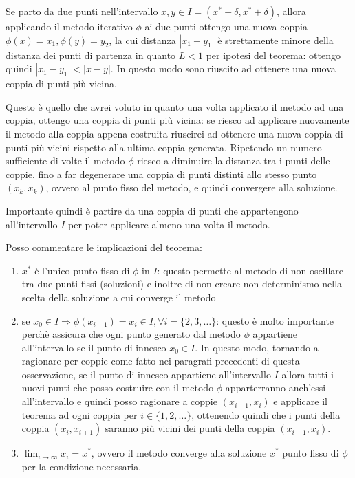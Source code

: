 \begin{oss}
Se parto da due punti nell'intervallo $x, y \in I = (x^{*} - \delta, x^{*} +
\delta)$, allora applicando il metodo iterativo $\phi$ ai due punti ottengo una
nuova coppia $\phi(x) = x_{1}, \phi(y) = y_{2}$, la cui distanza $|x_{1} - y_{1}|$
\`e strettamente minore della distanza dei punti di partenza in quanto $L < 1$
per ipotesi del teorema: ottengo quindi $|x_{1} - y_{1}| < |x - y|$. In questo
modo sono riuscito ad ottenere una nuova coppia di punti pi\`u vicina.

Questo \`e quello che avrei voluto in quanto una volta applicato il metodo ad
una coppia, ottengo una coppia di punti pi\`u vicina: se riesco ad applicare
nuovamente il metodo alla coppia appena costruita riuscirei ad ottenere una
nuova coppia di punti pi\`u vicini rispetto alla ultima coppia generata.
Ripetendo un numero sufficiente di volte il metodo $\phi$ riesco a diminuire la
distanza tra i punti delle coppie, fino a far degenerare una coppia di punti
distinti allo stesso punto $(x_{k}, x_{k})$, ovvero al punto fisso del metodo,
e quindi convergere alla soluzione.

Importante quindi \`e partire da una coppia di punti che appartengono
all'intervallo $I$ per poter applicare almeno una volta il metodo.

Posso commentare le implicazioni del teorema:
\begin{enumerate}
  \item $x^{*}$ \`e l'unico punto fisso di $\phi$ in $I$: questo permette al
  metodo di non oscillare tra due punti fissi (soluzioni) e inoltre di non
  creare non determinismo nella scelta della soluzione a cui converge il metodo
  \item se $x_{0} \in I \Rightarrow \phi(x_{i-1}) = x_{i} \in I, \forall i =
  \{2, 3, \ldots\}$: questo \`e molto importante perch\`e assicura che ogni
  punto generato dal metodo $\phi$ appartiene all'intervallo se il punto di
  innesco $x_{0} \in I$. In questo modo, tornando a ragionare per coppie come
  fatto nei paragrafi precedenti di questa osservazione, se il punto di innesco
  appartiene all'intervallo $I$ allora tutti i nuovi punti che posso costruire
  con il metodo $\phi$ apparterranno anch'essi all'intervallo e quindi posso 
  ragionare a coppie $(x_{i-1}, x_{i})$ e applicare il teorema ad ogni coppia
  per $i \in \{ 1, 2,\ldots \}$, ottenendo quindi che i punti della coppia
  $(x_{i}, x_{i+1})$ saranno pi\`u vicini dei punti della coppia $(x_{i-1},
  x_{i})$.
  \item $\lim_{i \rightarrow \infty}{x_{i}} = x^{*}$, ovvero il metodo converge
  alla soluzione $x^{*}$ punto fisso di $\phi$ per la condizione necessaria.
\end{enumerate}
\end{oss}

